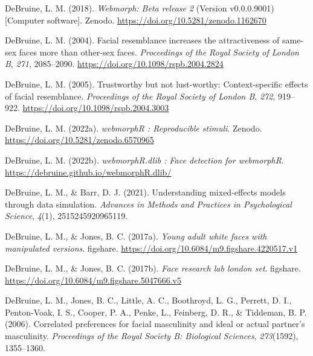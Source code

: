 \documentclass[
  doc,floatsintext]{apa6}
\newlength{\cslhangindent}
\newlength{\cslentryspacingunit} %
\newenvironment{CSLReferences}[2] %
 {%
  \setlength{\parindent}{0pt}
  \ifodd #1
  \let\oldpar\par
  \def\par{\hangindent=\cslhangindent\oldpar}
  \fi
  \setlength{\parskip}{#2\cslentryspacingunit}
 }%
 {}
\begin{document}
\begin{CSLReferences}{1}{0}
\leavevmode{}%
DeBruine, L. M. (2018). \emph{Webmorph: Beta release 2} (Version v0.0.0.9001) {[}Computer software{]}. Zenodo. \url{https://doi.org/10.5281/zenodo.1162670}

\leavevmode{}%
DeBruine, L. M. (2004). Facial resemblance increases the attractiveness of same-sex faces more than other-sex faces. \emph{Proceedings of the Royal Society of London B}, \emph{271}, 2085--2090. \url{https://doi.org/10.1098/rspb.2004.2824}

\leavevmode{}%
DeBruine, L. M. (2005). Trustworthy but not lust-worthy: Context-specific effects of facial resemblance. \emph{Proceedings of the Royal Society of London B}, \emph{272}, 919--922. \url{https://doi.org/10.1098/rspb.2004.3003}

\leavevmode{}%
DeBruine, L. M. (2022a). \emph{webmorphR : Reproducible stimuli}. Zenodo. \url{https://doi.org/10.5281/zenodo.6570965}

\leavevmode{}%
DeBruine, L. M. (2022b). \emph{webmorphR.dlib : Face detection for webmorphR}. \url{https://debruine.github.io/webmorphR.dlib/}

\leavevmode{}%
DeBruine, L. M., \& Barr, D. J. (2021). Understanding mixed-effects models through data simulation. \emph{Advances in Methods and Practices in Psychological Science}, \emph{4}(1), 2515245920965119.

\leavevmode{}%
DeBruine, L. M., \& Jones, B. C. (2017a). \emph{Young adult white faces with manipulated versions}. figshare. \url{https://doi.org/10.6084/m9.figshare.4220517.v1}

\leavevmode{}%
DeBruine, L. M., \& Jones, B. C. (2017b). \emph{Face research lab london set}. figshare. \url{https://doi.org/10.6084/m9.figshare.5047666.v5}

\leavevmode{}%
DeBruine, L. M., Jones, B. C., Little, A. C., Boothroyd, L. G., Perrett, D. I., Penton-Voak, I. S., Cooper, P. A., Penke, L., Feinberg, D. R., \& Tiddeman, B. P. (2006). Correlated preferences for facial masculinity and ideal or actual partner's masculinity. \emph{Proceedings of the Royal Society B: Biological Sciences}, \emph{273}(1592), 1355--1360.


\end{CSLReferences}
\end{document}
